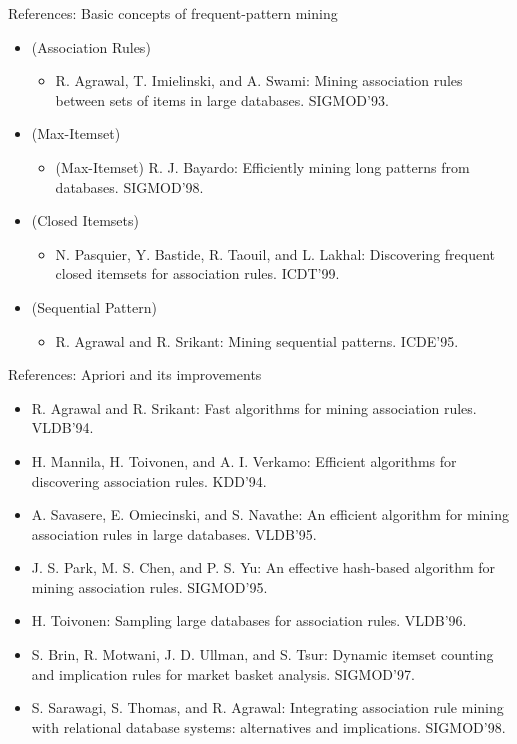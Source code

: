 \documentclass[aspectratio=169,t,xcolor=dvipsnames]{beamer}
\begin{document}
  {
    \begin{frame}{References: Basic concepts of frequent-pattern mining}
    \begin{itemize}
      \item (Association Rules)
      \begin{itemize}
        \item R. Agrawal, T. Imielinski, and A. Swami: Mining association rules between sets of items in large databases. SIGMOD'93.
      \end{itemize}
      \item (Max-Itemset)
      \begin{itemize}
        \item (Max-Itemset) R. J. Bayardo: Efficiently mining long patterns from databases. SIGMOD'98.
      \end{itemize}
      \item (Closed Itemsets)
      \begin{itemize}
        \item N. Pasquier, Y. Bastide, R. Taouil, and L. Lakhal: Discovering frequent closed itemsets for association rules. ICDT'99.
      \end{itemize}
      \item (Sequential Pattern)
      \begin{itemize}
        \item R. Agrawal and R. Srikant: Mining sequential patterns. ICDE'95.
      \end{itemize}
    \end{itemize}
    \end{frame}
  }

  {
    \begin{frame}{References: Apriori and its improvements}
    \begin{itemize}
      \item R. Agrawal and R. Srikant: Fast algorithms for mining association rules. VLDB'94.
      \item H. Mannila, H. Toivonen, and A. I. Verkamo: Efficient algorithms for discovering association rules. KDD'94.
      \item A. Savasere, E. Omiecinski, and S. Navathe: An efficient algorithm for mining association rules in large databases. VLDB'95.
      \item J. S. Park, M. S. Chen, and P. S. Yu: An effective hash-based algorithm for mining association rules. SIGMOD'95.
      \item H. Toivonen: Sampling large databases for association rules. VLDB'96.
      \item S. Brin, R. Motwani, J. D. Ullman, and S. Tsur: Dynamic itemset counting and implication rules for market basket analysis. SIGMOD'97.
      \item S. Sarawagi, S. Thomas, and R. Agrawal: Integrating association rule mining with relational database systems: alternatives and implications. SIGMOD'98.
    \end{itemize}
    \end{frame}
  }
\end{document}

